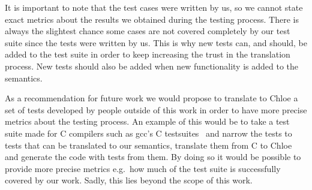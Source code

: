 It is important to note that the test cases were written by us, so we cannot state exact metrics about the results we obtained during the testing process.
There is always the slightest chance some cases are not covered completely by our test suite since the tests were written by us.
This is why new tests can, and should, be added to the test suite in order to keep increasing the trust in the translation process.
New tests should also be added when new functionality is added to the semantics.

As a recommendation for future work we would propose to translate to Chloe a set of tests developed by people outside of this work in order to have more precise metrics about the testing process.
An example of this would be to take a test suite made for C compilers such as gcc's C testsuites~\parencite{gcc-tests} and narrow the tests to tests that can be translated to our semantics, translate them from C to Chloe and generate the code with tests from them.
By doing so it would be possible to provide more precise metrics e.g.\ how much of the test suite is successfully covered by our work.
Sadly, this lies beyond the scope of this work.
